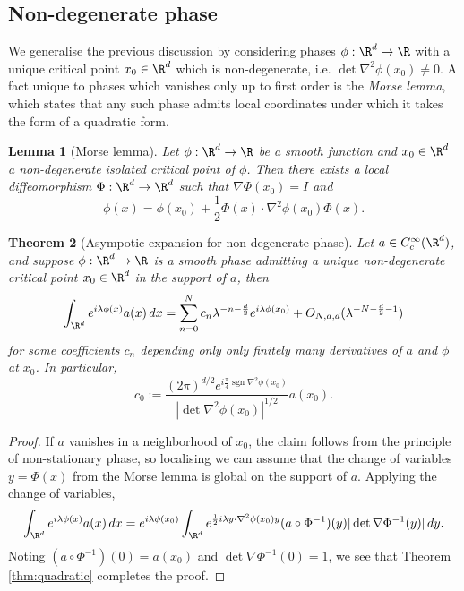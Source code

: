 \documentclass[reqno]{amsart}
\newtheorem{theorem}{Theorem}
\newtheorem{lemma}[theorem]{Lemma}
\theoremstyle{definition}
\theoremstyle{remark}
\begin{document}
\subsection{Non-degenerate phase}

We generalise the previous discussion by considering phases $\phi : \R^d \to \R$ with a unique critical point $x_0 \in \R^d$ which is non-degenerate, i.e. $\det \nabla^2 \phi(x_0) \neq 0$. A fact unique to phases which vanishes only up to first order is the \textit{Morse lemma}, which states that any such phase admits local coordinates under which it takes the form of a quadratic form. 

\begin{lemma}[Morse lemma]
	Let $\phi : \R^d \to \R$ be a smooth function and $x_0 \in \R^d$ a non-degenerate isolated critical point of $\phi$. Then there exists a local diffeomorphism $\Phi : \R^d \to \R^d$ such that $\nabla \Phi (x_0) = I$ and 
		\[ \phi (x) = \phi(x_0) + \frac12  \Phi(x) \cdot \nabla^2 \phi (x_0) \Phi(x) . \]
\end{lemma}

\begin{theorem}[Asympotic expansion for non-degenerate phase]
	Let $a \in C^\infty_c (\R^d)$, and suppose $\phi : \R^d \to \R$ is a smooth phase admitting a unique non-degenerate critical point $x_0 \in \R^d$ in the support of $a$, then 
		\[ \int_{\R^d} e^{i \lambda \phi(x)} a(x) \, dx = \sum_{n = 0}^N c_n \lambda^{-n - \frac{d}{2}} e^{i \lambda \phi(x_0)} + O_{N, a, d} (\lambda^{-N - \frac{d}{2}  - 1}) \]
	for some coefficients $c_n$ depending only only finitely many derivatives of $a$ and $\phi$ at $x_0$. In particular, 
		\[ c_0 := \frac{(2\pi)^{d/2} e^{i\frac{\pi}{4} \operatorname{sgn} \nabla^2 \phi(x_0)}  }{ |\det \nabla^2 \phi(x_0)|^{1/2}} a(x_0) . \]	
\end{theorem}

\begin{proof}
	If $a$ vanishes in a neighborhood of $x_0$, the claim follows from the principle of non-stationary phase, so localising we can assume that the change of variables $y = \Phi(x)$ from the Morse lemma is global on the support of $a$. Applying the change of variables, 
		\[ \int_{\R^d} e^{i \lambda \phi(x)} a(x) \, dx = e^{i \lambda \phi(x_0)} \int_{\R^d} e^{\frac12 i \lambda y \cdot \nabla^2 \phi(x_0) y} (a \circ \Phi^{-1})(y) |\det \nabla \Phi^{-1} (y)| \, dy. \]
	Noting $(a \circ \Phi^{-1}) (0) = a(x_0)$ and $\det \nabla \Phi^{-1} (0) = 1$, we see that Theorem \ref{thm:quadratic} completes the proof. 	
\end{proof}
\end{document}
